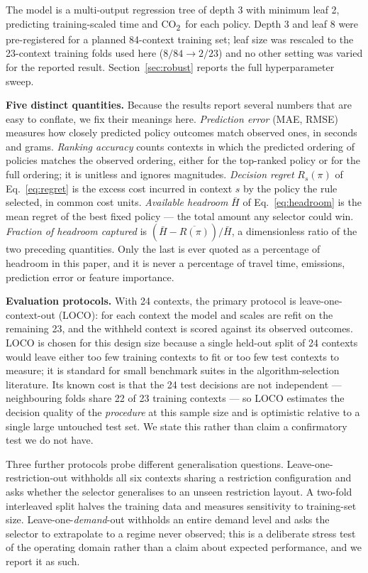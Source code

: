 \documentclass[10pt,a4paper]{article}
\newcommand{\CO}{CO\textsubscript{2}}
\begin{document}
The model is a multi-output regression tree \cite{R37} of depth 3 with minimum leaf 2, predicting training-scaled time and \CO\ for each policy. Depth 3 and leaf 8 were pre-registered for a planned 84-context training set; leaf size was rescaled to the 23-context training folds used here ($8/84\rightarrow2/23$) and no other setting was varied for the reported result. Section~\ref{sec:robust} reports the full hyperparameter sweep.

\textbf{Five distinct quantities.} Because the results report several numbers that are easy to conflate, we fix their meanings here. \emph{Prediction error} (MAE, RMSE) measures how closely predicted policy outcomes match observed ones, in seconds and grams. \emph{Ranking accuracy} counts contexts in which the predicted ordering of policies matches the observed ordering, either for the top-ranked policy or for the full ordering; it is unitless and ignores magnitudes. \emph{Decision regret} $R_s(\pi)$ of Eq.~\eqref{eq:regret} is the excess cost incurred in context $s$ by the policy the rule selected, in common cost units. \emph{Available headroom} $\bar H$ of Eq.~\eqref{eq:headroom} is the mean regret of the best fixed policy --- the total amount any selector could win. \emph{Fraction of headroom captured} is $(\bar H-\overline{R(\pi)})/\bar H$, a dimensionless ratio of the two preceding quantities. Only the last is ever quoted as a percentage of headroom in this paper, and it is never a percentage of travel time, emissions, prediction error or feature importance.

\textbf{Evaluation protocols.} With 24 contexts, the primary protocol is leave-one-context-out (LOCO): for each context the model and scales are refit on the remaining 23, and the withheld context is scored against its observed outcomes. LOCO is chosen for this design size because a single held-out split of 24 contexts would leave either too few training contexts to fit or too few test contexts to measure; it is standard for small benchmark suites in the algorithm-selection literature. Its known cost is that the 24 test decisions are not independent --- neighbouring folds share 22 of 23 training contexts --- so LOCO estimates the decision quality of the \emph{procedure} at this sample size and is optimistic relative to a single large untouched test set. We state this rather than claim a confirmatory test we do not have.

Three further protocols probe different generalisation questions. Leave-one-restriction-out withholds all six contexts sharing a restriction configuration and asks whether the selector generalises to an unseen restriction layout. A two-fold interleaved split halves the training data and measures sensitivity to training-set size. Leave-one-\emph{demand}-out withholds an entire demand level and asks the selector to extrapolate to a regime never observed; this is a deliberate stress test of the operating domain rather than a claim about expected performance, and we report it as such.
\end{document}
